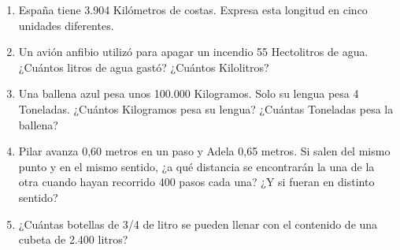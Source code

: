 \documentclass[twoside]{article}
\begin{document}
\begin{enumerate}
\item España tiene 3.904 Kilómetros de costas. Expresa esta longitud en cinco unidades diferentes.
\item Un avión anfibio utilizó para apagar un incendio 55 Hectolitros de agua. ¿Cuántos litros de agua gastó? ¿Cuántos Kilolitros?
\item Una ballena azul pesa unos 100.000 Kilogramos. Solo su lengua pesa 4 Toneladas. ¿Cuántos Kilogramos pesa su lengua? ¿Cuántas Toneladas pesa la ballena?
\item Pilar avanza 0,60 metros en un paso y Adela 0,65 metros. Si salen del mismo punto y en el mismo sentido, ¿a qué distancia se encontrarán la una de la otra cuando hayan recorrido 400 pasos cada una? ¿Y si fueran en distinto sentido?
\item ¿Cuántas botellas de 3/4 de litro se pueden llenar con el contenido de una cubeta de 2.400 litros?
\end{enumerate}
\end{document}
